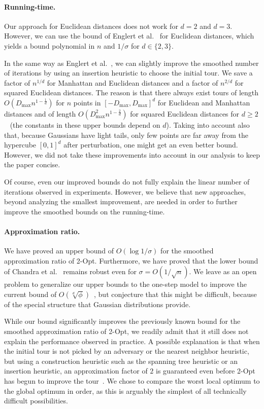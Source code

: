 \documentclass[11pt,DIV=12,a4paper]{scrartcl}
\newcommand{\maxx}{D_{\max}}
\begin{document}
\paragraph{Running-time.}
Our approach for Euclidean distances does not work for $d=2$ and $d=3$. However, we can use the bound of Englert et al.~\cite{EnglertEA:2Opt:2014}
for Euclidean distances, which yields a bound polynomial in $n$ and $1/\sigma$ for $d \in \{2,3\}$.

In the same way as Englert et al.~\cite{EnglertEA:2Opt:2014}, we can slightly
improve the smoothed number of iterations by using an insertion heuristic to choose the initial tour. We save
a factor of $n^{1/d}$ for Manhattan and Euclidean distances
and a factor of $n^{2/d}$ for squared Euclidean distances.
The reason is that there always exist tours of length $O(\maxx n^{1 - \frac 1d})$
for $n$ points in $[-\maxx, \maxx]^d$ for Euclidean and Manhattan distances
and of length $O(\maxx^2 n^{1 - \frac 2d})$ for squared Euclidean
distances for $d \geq 2$~\cite{Yukich:ProbEuclidean:1998} (the constants in these upper bounds depend on $d$).
Taking into account also that, because Gaussians have light tails, only few points are far away from the hypercube $[0,1]^d$ after perturbation,
one might get an even better bound. However, we did not take these improvements into account in our analysis to keep the paper concise.


Of course, even our improved bounds do not fully explain the 
linear number of iterations observed in experiments.
However, we believe that new approaches, beyond analyzing the smallest improvement, are needed in order to further improve the smoothed bounds on the running-time.

\paragraph{Approximation ratio.}



We have proved an upper bound of $O(\log 1/\sigma)$ for the smoothed approximation
ratio of 2-Opt. Furthermore, we have proved that the lower bound of Chandra et al.~\cite{ChandraEA:OldOpt:1999}
remains robust even for $\sigma = O(1/\sqrt{n})$. We leave as an open problem to generalize our upper bounds to the one-step model to improve the current
bound of $O(\sqrt[d]{\phi})$~\cite{EnglertEA:2Opt:2014}, but conjecture
that this might be difficult, because of the special structure that Gaussian distributions provide.

While our bound significantly improves the previously known bound for the smoothed approximation ratio of 2-Opt, we readily admit
that it still does not explain the performance observed in practice.
A possible explanation is that when the initial tour is not picked by an adversary or the nearest neighbor heuristic, but using a construction heuristic such as the spanning tree heuristic or an insertion heuristic, an approximation factor of $2$ is guaranteed even before 2-Opt has begun to improve the tour~\cite{RosenkrantzEA:AnalysisHeuristicsTSP:1977}. We chose to compare the worst local optimum to the global optimum in order, as this is arguably the
simplest of all technically difficult possibilities.
\end{document}
